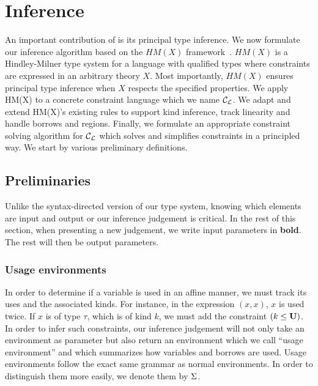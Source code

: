 \section{Inference}
\label{inference}

An important contribution of \affe is its principal type inference.
We now formulate our inference algorithm
based on the $HM(X)$ framework~\citep{DBLP:journals/tapos/OderskySW99}.
$HM(X)$ is a Hindley-Milner type system for a language
with qualified types where constraints are expressed in an arbitrary
theory $X$.
Most importantly,
$HM(X)$ ensures principal type inference
when $X$ respects the specified properties.
We apply HM(X) to a concrete constraint language which we name ${\mathcal C_{\mathcal L}}$.
We adapt and extend HM(X)'s existing rules to support kind inference,
track linearity and handle borrows and regions. Finally, we
formulate an appropriate constraint solving algorithm for ${\mathcal C_{\mathcal L}}$
which solves and simplifies constraints in a principled way.
We start by various preliminary definitions.

\subsection{Preliminaries}

Unlike the syntax-directed version of our type system, knowing which elements
are input and output or our inference judgement is critical. In the rest
of this section, when presenting a new judgement,
we write input parameters in \textbf{bold}. The rest will then be
output parameters.

\subsubsection{Usage environments}


In order to determine if a variable is used in an affine manner, we must track
its uses and the associated kinds. For instance, in the expression
$(x,x)$, $x$ is used twice. If $x$ is of type $\tau$, which is of kind $k$,
we must add the constraint $(k \leq \mathbf{U})$.
%
In order to infer such constraints, our inference judgement will not only
take an environment as parameter but also return an environment which
we call ``usage environment'' and which summarizes how variables and borrows
are used. Usage environments follow the exact same grammar
as normal environments. In order to distinguish them more easily,
we denote them by $\Sigma$.

